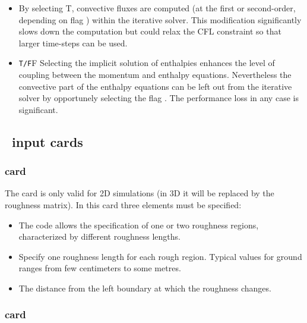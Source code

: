 \begin{itemize}
\item
{}
{By selecting T, convective fluxes are computed (at the first or second-order, 
depending on flag ) within the iterative solver. This modification
significantly slows down the computation but could relax the CFL constraint
so that larger time-steps can be used.}

\item
{}
{{\tt T/F}}{F}
{Selecting the implicit solution of enthalpies enhances the level of coupling
between the momentum and enthalpy equations. Nevertheless the convective part 
of the enthalpy equations can be left out from the iterative solver
by opportunely selecting the flag . The performance loss
in any case is significant.}
\end{itemize}

\subsection{\PDAC\ input cards}
\label{section:cards}
\subsubsection{ card}

The  card is only valid for 2D 
simulations (in 3D it will be replaced by the roughness matrix). In this
card three elements must be specified:
\begin{itemize}
\item
{}
{The code allows the specification of one or two roughness regions, characterized
by different roughness lengths.}

\item
{}
{Specify one roughness length for each rough region. Typical values for ground
ranges from few centimeters to some metres.}

\item
{}
{The distance from the left boundary at which the roughness changes.}

\end{itemize}

\subsubsection{ card}

